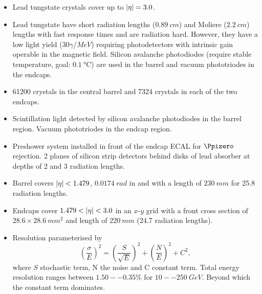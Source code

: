 \begin{itemize}
    \item Lead tungstate crystals cover up to ${|\eta|=3.0}$.
    \item Lead tungstate have short radiation lengths (${\SI{0.89}{cm}}$) and
        Moliere (${\SI{2.2}{cm}}$) lengths with fast response times and are
        radiation hard. However, they have a low light yield
        (${{30}{\gamma/MeV}}$) requiring photodetectors with intrinsic gain
        operable in the magnetic field. Silicon avalanche photodiodes (require
        stable temperature, goal: ${\SI{0.1}{\celsius}}$) are used in the
        barrel and vacuum phototriodes in the endcaps.
    \item 61200 crystals in the central barrel and 7324 crystals in each of the
        two endcaps.
    \item Scintillation light detected by silicon avalanche photodiodes in the
        barrel region. Vacuum phototriodes in the endcap region.
    \item Preshower system installed in front of the endcap ECAL for
        ${\Ppizero}$ rejection. 2 planes of silicon strip detectors behind
        disks of lead absorber at depths of 2 and 3 radiation lengths.
    \item Barrel covers ${|\eta|<1.479}$, ${\SI{0.0174}{rad}}$ in \dphi and
        \deta with a length of ${\SI{230}{mm}}$ for 25.8 radiation lengths.
    \item Endcaps cover ${1.479<\aeta<3.0}$ in an $x$-$y$ grid with a front
        cross section of ${28.6\times\SI{28.6}{mm^2}}$ and length of
        ${\SI{220}{mm}}$ (24.7 radiation lengths).
    \item Resolution parameterised by
        \begin{equation}
            \left( \frac{\sigma}{E} \right)^{2} = \left( \frac{S}{\sqrt{E}} \right)^{2}
            + \left( \frac{N}{E} \right)^{2} + C^2,
        \end{equation}
        where $S$ stochastic term, N the noise and C constant term. Total energy
        resolution ranges between ${1.50--0.35\%}$ for ${10--\SI{250}{GeV}}$.
        Beyond which the constant term dominates.
\end{itemize}

\subsection{\HCAL}

